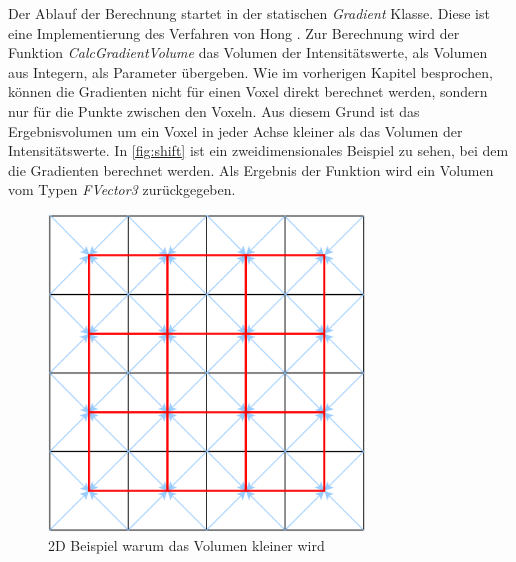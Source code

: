 Der Ablauf der Berechnung startet in der statischen \textit{Gradient} Klasse. Diese ist eine Implementierung des Verfahren von Hong \cite{hong2003method}. Zur Berechnung wird der Funktion \textit{CalcGradientVolume} das Volumen der Intensitätswerte, als Volumen aus Integern, als Parameter übergeben. Wie im vorherigen Kapitel besprochen, können die Gradienten nicht für einen Voxel direkt berechnet werden, sondern nur für die Punkte zwischen den Voxeln. Aus diesem Grund ist das Ergebnisvolumen um ein Voxel in jeder Achse kleiner als das Volumen der Intensitätswerte. In \autoref{fig:shift} ist ein zweidimensionales Beispiel zu sehen, bei dem die Gradienten berechnet werden. Als Ergebnis der Funktion wird ein Volumen vom Typen \textit{FVector3} zurückgegeben.


\begin{figure}
\centering 
\includegraphics[width=0.75\textwidth]{Logos/VoxelShift.png}
\caption{2D Beispiel warum das Volumen kleiner wird} 
\label{fig:shift} 
\end{figure}




